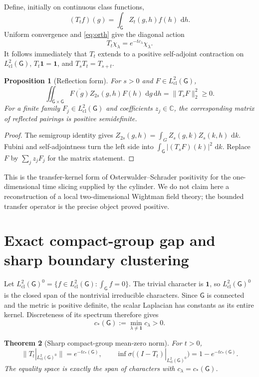 \documentclass[11pt]{article}
\newtheorem{theorem}{Theorem}[section]
\newtheorem{proposition}[theorem]{Proposition}
\theoremstyle{remark}
\newcommand{\G}{\mathsf G}
\newcommand{\dd}{\,\mathrm d}
\newcommand{\HclG}{L^2_{\mathrm{cl}}(\G)}
\begin{document}
Define, initially on continuous class functions,
\begin{equation}\label{eq:transfer}
 (T_tf)(g)=\int_\G Z_t(g,h)f(h)\,\dd h.
\end{equation}
Uniform convergence and \eqref{eq:orth} give the diagonal action
\begin{equation}\label{eq:diagonal}
 T_t\chi_\lambda=e^{-tc_\lambda}\chi_\lambda.
\end{equation}
It follows immediately that $T_t$ extends to a positive self-adjoint
contraction on $\HclG$, $T_t\mathbf1=\mathbf1$, and $T_sT_t=T_{s+t}$.

\begin{proposition}[Reflection form]\label{prop:rp}
For $s>0$ and $F\in\HclG$,
\begin{equation}\label{eq:rp}
 \iint_{\G\times\G}\overline{F(g)}Z_{2s}(g,h)F(h)\,\dd g\dd h
 =\|T_sF\|_2^2\ge0.
\end{equation}
For a finite family $F_j\in\HclG$ and coefficients $z_j\in\mathbb C$, the
corresponding matrix of reflected pairings is positive semidefinite.
\end{proposition}

\begin{proof}
The semigroup identity gives
$Z_{2s}(g,h)=\int_GZ_s(g,k)Z_s(k,h)\,\dd k$.  Fubini and self-adjointness turn
the left side into $\int_\G|(T_sF)(k)|^2\,\dd k$.  Replace $F$ by
$\sum_jz_jF_j$ for the matrix statement.
\end{proof}

This is the transfer-kernel form of Osterwalder--Schrader positivity for the
one-dimensional time slicing supplied by the cylinder.  We do not claim here
a reconstruction of a local two-dimensional Wightman field theory; the
bounded transfer operator is the precise object proved positive.

\section{Exact compact-group gap and sharp boundary clustering}

Let $\HclG^0=\{f\in\HclG:\int_\G f=0\}$.  The trivial character is
$\mathbf1$, so $\HclG^0$ is the closed span of the nontrivial irreducible
characters.  Since $\G$ is connected and the metric is positive definite,
the scalar Laplacian has constants as its entire kernel.  Discreteness of its
spectrum therefore gives
\[
 c_*(\G):=\min_{\lambda\ne\mathbf1}c_\lambda>0.
\]

\begin{theorem}[Sharp compact-group mean-zero norm]\label{thm:gap}
For $t>0$,
\[
 \|T_t|_{\HclG^0}\|=e^{-tc_*(\G)},\qquad
 \inf\sigma\bigl((I-T_t)|_{\HclG^0}\bigr)=1-e^{-tc_*(\G)}.
\]
The equality space is exactly the span of characters with
$c_\lambda=c_*(\G)$.
\end{theorem}
\end{document}
